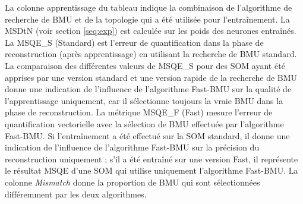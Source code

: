 	La colonne apprentissage du tableau indique la combinaison de l'algorithme de recherche de BMU et de la topologie qui a été utilisée pour l'entraînement. La MSDtN (voir section \ref{seq:exp}) est calculée sur les poids des neurones entraînés. La MSQE\_S (Standard) est l'erreur de quantification dans la phase de reconstruction (après apprentissage) en utilisant la recherche de BMU standard. La comparaison des différentes valeurs de MSQE\_S pour des SOM ayant été apprises par une version standard et une version rapide de la recherche de BMU donne une indication de l'influence de l'algorithme Fast-BMU sur la qualité de l'apprentissage uniquement, car il sélectionne toujours la vraie BMU dans la phase de reconstruction. La métrique MSQE\_F (Fast) mesure l'erreur de quantification vectorielle avec la sélection de BMU effectuée par l'algorithme Fast-BMU. Si l'entraînement a été effectué sur la SOM standard, il donne une indication de l'influence de l'algorithme Fast-BMU sur la précision du reconstruction uniquement ; s'il a été entraîné sur une version Fast, il représente le résultat MSQE d'une SOM qui utilise uniquement l'algorithme Fast-BMU. La colonne \textit{Mismatch} donne la proportion de BMU qui sont sélectionnées différemment par les deux algorithmes.

